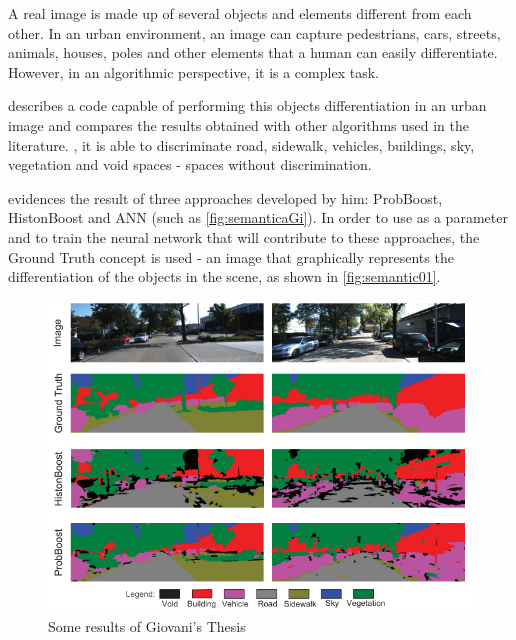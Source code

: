     A real image is made up of several objects and elements different from each other. In an urban environment, an image can capture pedestrians, cars, streets, animals, houses, poles and other elements that a human can easily differentiate. However, in an algorithmic perspective, it is a complex task.

    \cite{giovaniThesis} describes a code capable of performing this objects differentiation in an urban image and compares the results obtained with other algorithms used in the literature. \cite{giovaniThesis}, it is able to discriminate road, sidewalk, vehicles, buildings, sky, vegetation and void spaces - spaces without discrimination.

    \cite{giovaniThesis} evidences the result of three approaches developed by him: ProbBoost, HistonBoost and ANN (such as \autoref{fig:semanticaGi}). In order to use as a parameter and to train the neural network that will contribute to these approaches, the Ground Truth concept is used - an image that graphically represents the differentiation of the objects in the scene, as shown in \autoref{fig:semantic01}.

    \begin{figure}[H]
     \caption{\label{fig:semanticaGi}
Some results of Giovani's Thesis}
     \begin{center}
        \includegraphics[width=1\textwidth]{images/semanticaGi.png}
     \end{center}
    \end{figure}    

